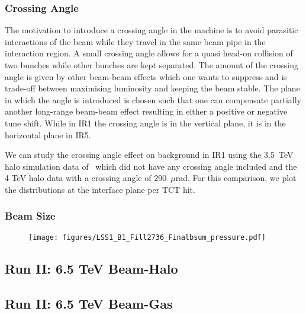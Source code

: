 \subsubsection{Crossing Angle}
The motivation to introduce a crossing angle in the machine is to avoid parasitic interactions of the beam while they travel in the same beam pipe in the interaction region. A small crossing angle allows for a quasi head-on collision of two bunches while other bunches are kept separated. The amount of the crossing angle is given by other beam-beam effects which one wants to suppress and is trade-off between maximising luminosity and keeping the beam stable. The plane in which the angle is introduced is chosen such that one can compensate partially another long-range beam-beam effect resulting in either a positive or negative tune shift. While in IR1 the crossing angle is in the vertical plane, it is in the horizontal plane in IR5.

We can study the crossing angle effect on background in IR1 using the 3.5~TeV halo simulation data of~\cite{nimPaperRod} which did not have any crossing angle included and the 4 TeV halo data with a crossing angle of 290~$\mu$rad. For this comparison, we plot the distributions at the interface plane per TCT hit. 

\subsubsection{Beam Size}

\begin{figure}[!htb]
\begin{center}
\texttt{[image: figures/LSS1\_B1\_Fill2736\_Finalbsum\_pressure.pdf]}
\end{center}
\vspace{-0.6cm}
 \caption{
  \label{pressure2012}}
\end{figure}

\subsection{Run II: 6.5 TeV Beam-Halo}
\subsection{Run II: 6.5 TeV Beam-Gas}
